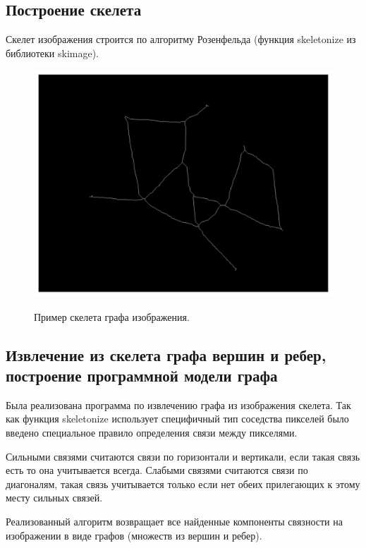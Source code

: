 \documentclass[10pt]{article}
\begin{document}
	
	\subsection*{Построение скелета}
	
	
	Скелет изображения строится по алгоритму Розенфельда (функция skeletonize из библиотеки skimage).
	
	\begin{figure}[h]
		\begin{center}
			{\includegraphics[width=0.4\linewidth]{data/skeleton.pdf}}
		\end{center}
		\caption{Пример скелета графа изображения.}
		\label{ris:image8}
	\end{figure}
	
	
	
	\subsection*{Извлечение из скелета графа вершин и ребер, построение программной модели графа}
	
	Была реализована программа по извлечению графа из изображения скелета. Так как функция skeletonize использует специфичный тип соседства пикселей было введено специальное правило определения связи между пикселями.
	
	Сильными связями считаются связи по горизонтали и вертикали, если такая связь есть то она учитывается всегда. Слабыми связями считаются связи по диагоналям, такая связь учитывается только если нет обеих прилегающих к этому месту сильных связей.
	
	Реализованный алгоритм возвращает все найденные компоненты связности на изображении в виде графов (множеств из вершин и ребер).
	
\end{document}
